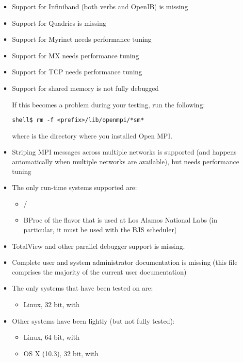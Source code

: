 \begin{itemize}
\item Support for Infiniband (both verbs and OpenIB) is missing
\item Support for Quadrics is missing
\item Support for Myrinet needs performance tuning
\item Support for MX needs performance tuning
\item Support for TCP needs performance tuning
\item Support for shared memory is not fully debugged
  
  If this becomes a problem during your testing, run the following:

\lstset{style=ompi-cmdline}
\begin{lstlisting}
shell$ rm -f <prefix>/lib/openmpi/*sm*
\end{lstlisting}

  where  is the directory where you installed Open
  MPI.
  
\item Striping MPI messages across multiple networks is supported (and
  happens automatically when multiple networks are available), but
  needs performance tuning

\item The only run-time systems supported are:
  \begin{itemize}
  \item {} / 
  \item BProc of the flavor that is used at Los Alamos National Labs (in
    particular, it must be used with the BJS scheduler)
  \end{itemize}

\item TotalView and other parallel debugger support is missing.
  
\item Complete user and system administrator documentation is missing
  (this file comprises the majority of the current user documentation)

\item The only systems that have been tested on are:
  \begin{itemize}
  \item Linux, 32 bit, with 
  \end{itemize}

\item Other systems have been lightly (but not fully tested):
  \begin{itemize}
  \item Linux, 64 bit, with 
  \item OS X (10.3), 32 bit, with 
  \end{itemize}


\end{itemize}
